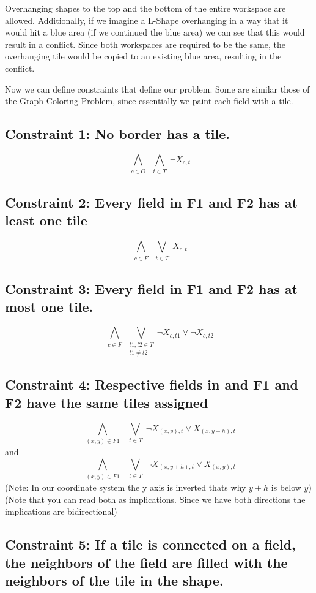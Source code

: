 \documentclass{../base/base}
\begin{document}
Overhanging shapes to the top and the bottom of the entire workspace are allowed. Additionally, if we imagine a L-Shape overhanging in a way that it would hit a blue area (if we continued the blue area) we can see that this would result in a conflict. Since both workspaces are required to be the same, the overhanging tile would be copied to an existing blue area, resulting in the conflict.




Now we can define constraints that define our problem. Some are similar those of the Graph Coloring Problem, since essentially we paint each field with a tile. 


\subsection{Constraint 1: No border has a tile.}
$$\bigwedge_{\substack{c \in O}} \bigwedge_{\substack{t \in T}} \neg X_{c,t}$$

\subsection{Constraint 2: Every field in F1 and F2 has at least one tile}
$$\bigwedge_{\substack{c \in F}} \bigvee_{\substack{t \in T }} X_{c,t}$$


\subsection{Constraint 3: Every field in F1 and F2 has at most one tile.}
$$\bigwedge_{\substack{c \in F}} \bigvee_{\substack{t1,t2 \in T \\ t1 \neq t2 }} \neg X_{c,t1} \lor \neg X_{c,t2}$$

\subsection{Constraint 4: Respective fields in and F1 and F2 have the same tiles assigned}
$$\bigwedge_{\substack{(x,y) \in F1}}\ \bigvee_{\substack{t \in T}} \neg X_{(x,y),t} \lor X_{(x,y+h),t} $$
and
$$\bigwedge_{\substack{(x,y) \in F1}}\ \bigvee_{\substack{t \in T}} \neg X_{(x,y+h),t} \lor X_{(x,y),t} $$
(Note: In our coordinate system the y axis is inverted thats why $y+h$ is below $y$)\\
(Note that you can read both as implications. Since we have both directions the implications are bidirectional)


\subsection{Constraint 5: If a tile is connected on a field, the neighbors of the field are filled with the neighbors of the tile in the shape.}
\end{document}
